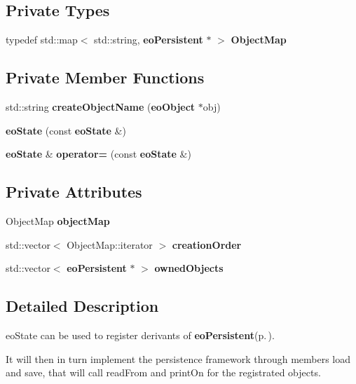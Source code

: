 \subsection*{Private Types}
\begin{CompactItemize}
\item 
typedef std::map$<$ std::string, {\bf eo\-Persistent} $\ast$ $>$ {\bf Object\-Map}\label{classeo_state_y0}

\end{CompactItemize}
\subsection*{Private Member Functions}
\begin{CompactItemize}
\item 
std::string {\bf create\-Object\-Name} ({\bf eo\-Object} $\ast$obj)\label{classeo_state_d0}

\item 
{\bf eo\-State} (const {\bf eo\-State} \&)\label{classeo_state_d1}

\item 
{\bf eo\-State} \& {\bf operator=} (const {\bf eo\-State} \&)\label{classeo_state_d2}

\end{CompactItemize}
\subsection*{Private Attributes}
\begin{CompactItemize}
\item 
Object\-Map {\bf object\-Map}\label{classeo_state_r0}

\item 
std::vector$<$ Object\-Map::iterator $>$ {\bf creation\-Order}\label{classeo_state_r1}

\item 
std::vector$<$ {\bf eo\-Persistent} $\ast$ $>$ {\bf owned\-Objects}\label{classeo_state_r2}

\end{CompactItemize}


\subsection{Detailed Description}
eo\-State can be used to register derivants of {\bf eo\-Persistent}{\rm (p.\,\pageref{classeo_persistent})}. 

It will then in turn implement the persistence framework through members load and save, that will call read\-From and print\-On for the registrated objects.

